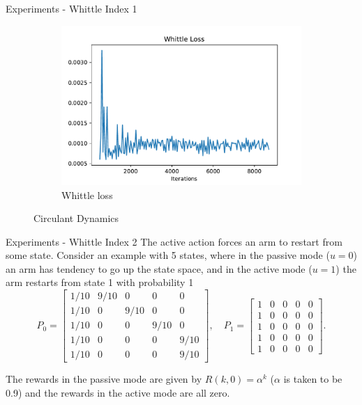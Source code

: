 \documentclass{beamer}
\begin{document}
\begin{frame}{Experiments - Whittle Index 1}
\begin{figure}[H]
     \begin{subfigure}{0.48\linewidth}
         \centering
         \includegraphics[width=0.8\linewidth]{Whittle Loss.pdf}
         \caption{Whittle loss}
         \label{}
     \end{subfigure}
     \caption{Circulant Dynamics}
     \label{}
\end{figure}

\end{frame}
\begin{frame}{Experiments - Whittle Index 2}
    The active action forces an arm to restart from some state. 
    Consider an example with 5 states, where in the passive mode ($u=0$) an arm has tendency to go up the state space, and in the active mode ($u=1$) the arm restarts from state 1 with probability 1
$$
P_0=\left[\begin{array}{ccccc}
1/10 & 9/10 & 0 & 0 & 0\\
1/10 & 0 & 9/10 & 0 & 0\\
1/10 & 0 & 0 & 9/10 & 0\\
1/10 & 0 & 0 & 0 & 9/10\\
1/10 & 0 & 0 & 0 & 9/10
\end{array}\right], \quad P_1=\left[\begin{array}{ccccc}
1 & 0 & 0 & 0 & 0\\
1 & 0 & 0 & 0 & 0\\
1 & 0 & 0 & 0 & 0\\
1 & 0 & 0 & 0 & 0\\
1 & 0 & 0 & 0 & 0
\end{array}\right].
$$

The rewards in the passive mode are given by $R(k,0)=\alpha^k$ ($\alpha$ is taken to be 0.9) and the rewards in the active mode are all zero.\\
\end{frame}
\end{document}
